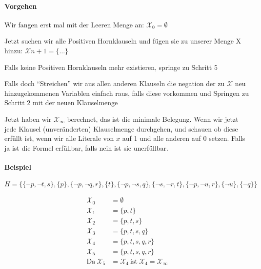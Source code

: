 \documentclass[
    ngerman,
    color=3b,
    summary,
    boxarc,
    main,
    fleqn,
    leqno,
]{rubos-tuda-template}
\begin{document}
    \paragraph{Vorgehen}
    \begin{steps}
        \item Wir fangen erst mal mit der Leeren Menge an: $\mathcal{X}_0=\emptyset$
        \item Jetzt suchen wir alle Positiven Hornklauseln und fügen sie zu unserer Menge X hinzu: $\mathcal{X}{n+1}=\{\dots\}$
        \item Falls keine Positiven Hornklauseln mehr existieren, springe zu Schritt 5
        \item Falls doch \enquote{Streichen} wir aus allen anderen Klauseln die negation der zu $\mathcal{X}$ neu hinzugekommenen Variablen einfach raus, falls diese vorkommen und Springen zu Schritt 2 mit der neuen Klauselmenge
        \item Jetzt haben wir $\mathcal{X}_\infty$ berechnet, das ist die minimale Belegung. Wenn wir jetzt jede Klausel (unveränderten) Klauselmenge durchgehen, und schauen ob diese erfüllt ist, wenn wir alle Literale von $x$ auf 1 und alle anderen auf $0$ setzen. Falls ja ist die Formel erfüllbar, falls nein ist sie unerfüllbar.
    \end{steps}
    \paragraph{Beispiel}\mbox{}

    $H = \{\{\lnot p, \lnot t, s\}, \{p\}, \{\lnot p, \lnot q, r\}, \{t\}, \{\lnot p, \lnot s, q\}, \{\lnot s, \lnot r, t\}, \{\lnot p, \lnot u, r\}, \{\lnot u\}, \{\lnot q\}\}$
    \begin{ceqn}
        \begin{align*}
            \mathcal{X}_0             & = \emptyset                                                      \\
            \mathcal{X}_1             & = \{p, t\}                                                       \\
            \mathcal{X}_2             & = \{p, t, s\}                                                    \\
            \mathcal{X}_3             & = \{p, t, s, q\}                                                 \\
            \mathcal{X}_4             & = \{p, t, s, q, r\}                                              \\
            \mathcal{X}_5             & = \{p, t, s, q, r\}                                              \\
            \mathrm{Da}~\mathcal{X}_5 & = \mathcal{X}_4 ~\mathrm{ist}~\mathcal{X}_4 = \mathcal{X}_\infty
        \end{align*}
    \end{ceqn}
\end{document}

